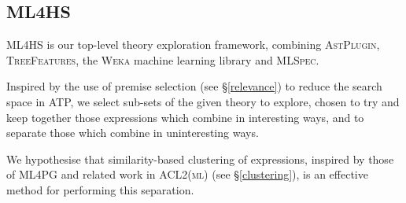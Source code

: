 \subsection{\textsc{ML4HS}}\label{ml4hs}

\textsc{ML4HS} is our top-level theory exploration framework, combining \textsc{AstPlugin}, \textsc{TreeFeatures}, the \textsc{Weka} machine learning library and \textsc{MLSpec}.

Inspired by the use of premise selection (see \S \ref{relevance}) to reduce the search space in ATP,
we select sub-sets of the given theory to explore, chosen to try and keep together those expressions which combine in interesting ways, and to separate those which combine in uninteresting ways.

We hypothesise that similarity-based clustering of expressions, inspired by those of \textsc{ML4PG}  and related work in \textsc{ACL2(ml)} (see \S \ref{clustering}), is an effective method for performing this separation.



